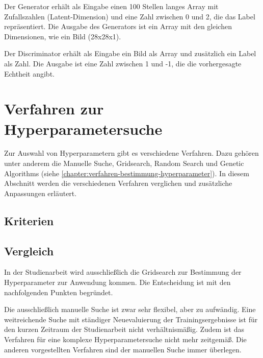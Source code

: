 Der Generator erhält als Eingabe einen 100 Stellen langes Array mit Zufallszahlen (Latent-Dimension) und eine Zahl zwischen 0 und 2, die das Label repräsentiert.
Die Ausgabe des Generators ist ein Array mit den gleichen Dimensionen, wie ein Bild (28x28x1).
\newline

Der Discriminator erhält als Eingabe ein Bild als Array und zusätzlich ein Label als Zahl.
Die Ausgabe ist eine Zahl zwischen 1 und -1, die die vorhergesagte Echtheit angibt.

\section{Verfahren zur Hyperparametersuche}
Zur Auswahl von Hyperparametern gibt es verschiedene Verfahren.
Dazu gehören unter anderem die Manuelle Suche, Gridsearch, Random Search und Genetic Algorithms (siehe \cref{chapter:verfahren-bestimmung-hyperparameter}).
In diesem Abschnitt werden die verschiedenen Verfahren verglichen und zusätzliche Anpassungen erläutert.

\subsection{Kriterien}

\subsection{Vergleich}
In der Studienarbeit wird ausschließlich die Gridsearch zur Bestimmung der Hyperparameter zur Anwendung kommen.
Die Entscheidung ist mit den nachfolgenden Punkten begründet.

Die ausschließlich manuelle Suche ist zwar sehr flexibel, aber zu aufwändig.
Eine weitreichende Suche mit ständiger Neuevaluierung der Trainingsergebnisse ist für den kurzen Zeitraum der Studienarbeit nicht verhältnismäßig.
Zudem ist das Verfahren für eine komplexe Hyperparametersuche nicht mehr zeitgemäß.
Die anderen vorgestellten Verfahren sind der manuellen Suche immer überlegen.

